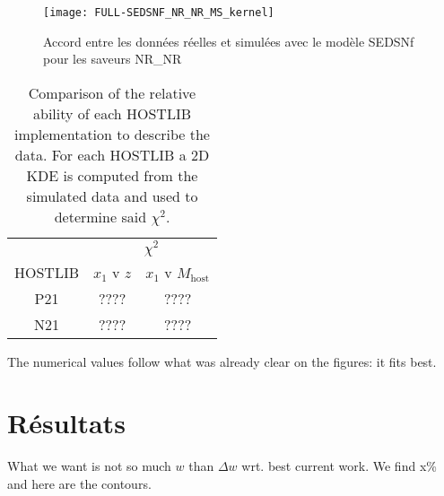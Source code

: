 \documentclass[../main/main.tex]{subfiles}
\begin{document}

\begin{figure*}
    \centering
    \texttt{[image: FULL-SEDSNF\_NR\_NR\_MS\_kernel]}
    \caption[Accord entre les données réelles et simulées avec le modèle SEDSNf
    pour les saveurs NR\_NR]{Accord entre les données réelles et simulées avec
    le modèle SEDSNf pour les saveurs NR\_NR}
    \label{fig:2dhex}
\end{figure*}

\begin{table}
    \centering
    \caption{Comparison of the relative ability of each HOSTLIB implementation
    to describe the data. For each HOSTLIB a 2D KDE is computed from the simulated
    data and used to determine said $\chi^2$.}
    \label{tab:chi2comp}
    \begin{tabular}{c|cc}
        \hline\hline
                & \multicolumn{2}{c}{$\chi^2$}
        \\
        HOSTLIB & $x_1$ v $z$ & $x_1$ v $M_\mathrm{host}$
        \\\hline
        P21     & ????        & ????
        \\
        N21     & ????        & ????
        \\
        \hline
    \end{tabular}
\end{table}

The numerical values follow what was already clear on the figures: it fits best.

\section{Résultats}\label{sec:simres}
What we want is not so much $w$ than $\Delta w$ wrt. best current work. We find
x\% and here are the contours.
\end{document}
